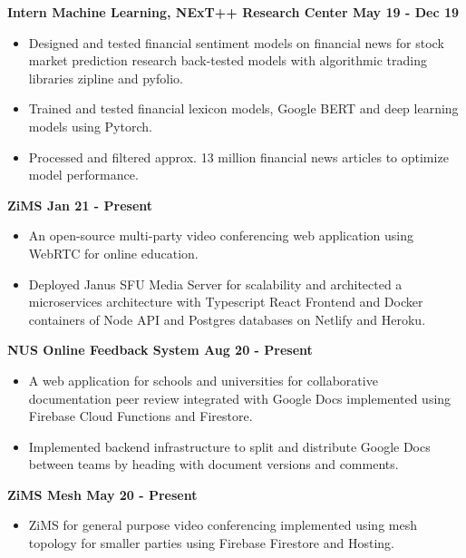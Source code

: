 \documentclass[11pts]{article}
\begin{document}
\noindent \centerline{\large \bf Intern Machine Learning, NExT++ Research Center \href{https://github.com/GelliFrancesco/assetpriceprediction}{\faGithub} \hfill May 19 - Dec 19}
\begin{itemize}
    \item Designed and tested financial sentiment models on financial news for stock market prediction research back-tested models with algorithmic trading libraries zipline and pyfolio.
    \item Trained and tested financial lexicon models, Google BERT and deep learning models using Pytorch.
    \item Processed and filtered approx. 13 million financial news articles to optimize model performance.
\end{itemize}
\smallskip

\smallskip

\noindent \centerline{\large \bf ZiMS \href{https://github.com/yzia2000/zims}{\faGithub} \hfill Jan 21 - Present}
\begin{itemize}
    \item An open-source multi-party video conferencing web application using WebRTC for online education.
    \item Deployed Janus SFU Media Server for scalability and architected a microservices architecture with Typescript React Frontend and Docker containers of Node API and Postgres databases on Netlify and Heroku.
\end{itemize}
\smallskip

\noindent \centerline{\large \bf NUS Online Feedback System \href{https://youtu.be/LVmKodrE8e0}{\faYoutube} \hfill Aug 20 - Present}
\begin{itemize}
    \item A web application for schools and universities for collaborative documentation peer review integrated with Google Docs implemented using Firebase Cloud Functions and Firestore.
    \item Implemented backend infrastructure to split and distribute Google Docs between teams by heading with document versions and comments.
\end{itemize}
\smallskip

\noindent \centerline{\large \bf ZiMS Mesh \href{https://github.com/yzia2000/zims-mesh}{\faGithub} \hfill May 20 - Present}
\begin{itemize}
    \item ZiMS for general purpose video conferencing implemented using mesh topology for smaller parties using Firebase Firestore and Hosting.
\end{itemize}
\smallskip
\end{document}

